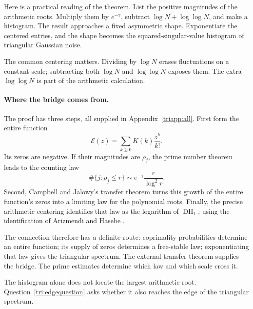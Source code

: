 Here is a practical reading of the theorem.
List the positive magnitudes of the arithmetic roots.
Multiply them by $e^{-\gamma}$, subtract
$\log N+\log\log N$, and make a histogram.
The result approaches a fixed asymmetric shape.
Exponentiate the centered entries, and the shape becomes the
squared-singular-value histogram of triangular Gaussian noise.

The common centering matters.
Dividing by $\log N$ erases fluctuations on a constant scale;
subtracting both $\log N$ and $\log\log N$ exposes them.
The extra $\log\log N$ is part of the arithmetic calculation.

\paragraph{Where the bridge comes from.}
The proof has three steps, all supplied in Appendix~\ref{triapp:all}.
First form the entire function
\[
 \mathcal E(z)=\sum_{k\ge0}K(k)\frac{z^k}{k!}.
\]
Its zeros are negative.  If their magnitudes are $\rho_j$, the prime
number theorem leads to the counting law
\[
 \#\{j:\rho_j\le r\}\sim e^{-\gamma}\frac r{\log^2r}.
\]
Second, Campbell and Jalowy's transfer theorem
\cite[Corollary 2.3]{finCampbellJalowy} turns this growth of the
entire function's zeros into a limiting law for the polynomial roots.
Finally, the precise arithmetic centering identifies that law as the
logarithm of $\operatorname{DH}_1$, using the identification of
Arizmendi and Hasebe \cite[Proposition 4.4]{triArizmendiHasebe}.

The connection therefore has a definite route:
coprimality probabilities determine an entire function;
its supply of zeros determines a free-stable law;
exponentiating that law gives the triangular spectrum.
The external transfer theorem supplies the bridge.
The prime estimates determine which law and which scale cross it.

The histogram alone does not locate the largest arithmetic root.
Question~\ref{tri:edgequestion} asks whether it also reaches the edge
of the triangular spectrum.
